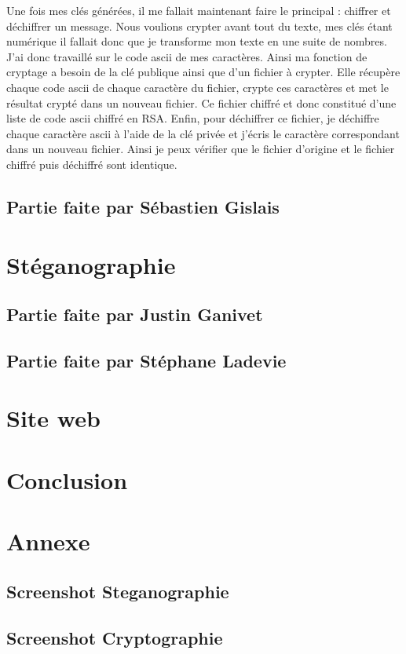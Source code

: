 \documentclass[a4paper,12pt]{article}
\begin{document}
		 Une fois mes clés générées, il me fallait maintenant faire le principal : chiffrer et déchiffrer un message. Nous voulions 
		 crypter avant tout du texte, mes clés étant numérique il fallait donc que je transforme mon texte en une suite de nombres.
		 J'ai donc travaillé sur le code ascii de mes caractères. Ainsi ma fonction de cryptage a besoin de la clé publique ainsi que
		 d'un fichier à crypter. Elle récupère chaque code ascii de chaque caractère du fichier, crypte ces caractères et met le
		 résultat crypté dans un nouveau fichier. Ce fichier chiffré et donc constitué d'une liste de code ascii chiffré en RSA.
		 Enfin, pour déchiffrer ce fichier, je déchiffre chaque caractère ascii à l'aide de la clé privée et j'écris le caractère
		 correspondant dans un nouveau fichier. Ainsi je peux vérifier que le fichier d'origine et le fichier chiffré puis déchiffré
		 sont identique.    
		 
		\subsection{Partie faite par Sébastien Gislais}
	\section{Stéganographie}
		\subsection{Partie faite par Justin Ganivet}
		\subsection{Partie faite par Stéphane Ladevie}
	\section{Site web}
	\section{Conclusion}
	\section{Annexe}
		\subsection {Screenshot Steganographie}
		\subsection {Screenshot Cryptographie}
\end{document}
